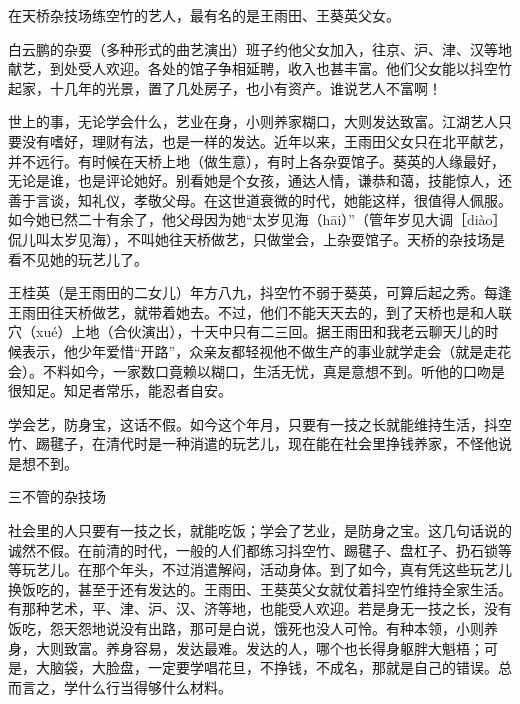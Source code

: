 \documentclass[12pt,UTF8]{ctexbook}
\begin{document}
在天桥杂技场练空竹的艺人，最有名的是王雨田、王葵英父女。



白云鹏的杂耍（多种形式的曲艺演出）班子约他父女加入，往京、沪、津、汉等地献艺，到处受人欢迎。各处的馆子争相延聘，收入也甚丰富。他们父女能以抖空竹起家，十几年的光景，置了几处房子，也小有资产。谁说艺人不富啊！

世上的事，无论学会什么，艺业在身，小则养家糊口，大则发达致富。江湖艺人只要没有嗜好，理财有法，也是一样的发达。近年以来，王雨田父女只在北平献艺，并不远行。有时候在天桥上地（做生意），有时上各杂耍馆子。葵英的人缘最好，无论是谁，也是评论她好。别看她是个女孩，通达人情，谦恭和蔼，技能惊人，还善于言谈，知礼仪，孝敬父母。在这世道衰微的时代，她能这样，很值得人佩服。如今她已然二十有余了，他父母因为她“太岁见海（hāi）”（管年岁见大调［diào］侃儿叫太岁见海），不叫她往天桥做艺，只做堂会，上杂耍馆子。天桥的杂技场是看不见她的玩艺儿了。

王桂英（是王雨田的二女儿）年方八九，抖空竹不弱于葵英，可算后起之秀。每逢王雨田往天桥做艺，就带着她去。不过，他们不能天天去的，到了天桥也是和人联穴（xué）上地（合伙演出），十天中只有二三回。据王雨田和我老云聊天儿的时候表示，他少年爱惜“开路”，众亲友都轻视他不做生产的事业就学走会（就是走花会）。不料如今，一家数口竟赖以糊口，生活无忧，真是意想不到。听他的口吻是很知足。知足者常乐，能忍者自安。

学会艺，防身宝，这话不假。如今这个年月，只要有一技之长就能维持生活，抖空竹、踢毽子，在清代时是一种消遣的玩艺儿，现在能在社会里挣钱养家，不怪他说是想不到。





三不管的杂技场


社会里的人只要有一技之长，就能吃饭；学会了艺业，是防身之宝。这几句话说的诚然不假。在前清的时代，一般的人们都练习抖空竹、踢毽子、盘杠子、扔石锁等等玩艺儿。在那个年头，不过消遣解闷，活动身体。到了如今，真有凭这些玩艺儿换饭吃的，甚至于还有发达的。王雨田、王葵英父女就仗着抖空竹维持全家生活。有那种艺术，平、津、沪、汉、济等地，也能受人欢迎。若是身无一技之长，没有饭吃，怨天怨地说没有出路，那可是白说，饿死也没人可怜。有种本领，小则养身，大则致富。养身容易，发达最难。发达的人，哪个也长得身躯胖大魁梧；可是，大脑袋，大脸盘，一定要学唱花旦，不挣钱，不成名，那就是自己的错误。总而言之，学什么行当得够什么材料。
\end{document}
